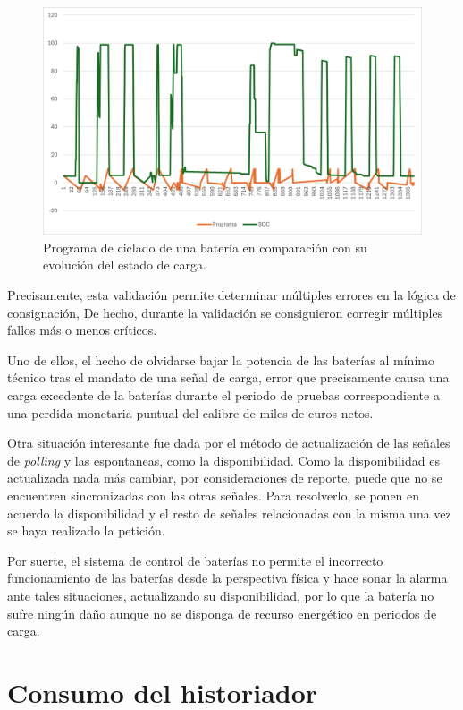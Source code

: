 \begin{figure}
  \centering
  \includegraphics[width=0.75\linewidth]{figures/programa-bateria.png}
  \caption{Programa de ciclado de una batería en comparación con su evolución del estado de carga.}
  \label{fig:programa-bateria}
\end{figure}

Precisamente, esta validación permite determinar múltiples errores en la lógica de consignación, De hecho, durante la validación se consiguieron corregir múltiples fallos más o menos críticos.

Uno de ellos, el hecho de olvidarse bajar la potencia de las baterías al mínimo técnico tras el mandato de una señal de carga, error que precisamente causa una carga excedente de la baterías durante el periodo de pruebas correspondiente a una perdida monetaria puntual del calibre de miles de euros netos.

Otra situación interesante fue dada por el método de actualización de las señales de \textit{polling} y las espontaneas, como la disponibilidad. Como la disponibilidad es actualizada nada más cambiar, por consideraciones de reporte, puede que no se encuentren sincronizadas con las otras señales. Para resolverlo, se ponen en acuerdo la disponibilidad y el resto de señales relacionadas con la misma una vez se haya realizado la petición.

Por suerte, el sistema de control de baterías no permite el incorrecto funcionamiento de las baterías desde la perspectiva física y hace sonar la alarma ante tales situaciones, actualizando su disponibilidad, por lo que la batería no sufre ningún daño aunque no se disponga de recurso energético en periodos de carga.

\section{Consumo del historiador}
\label{makereference3.5}

